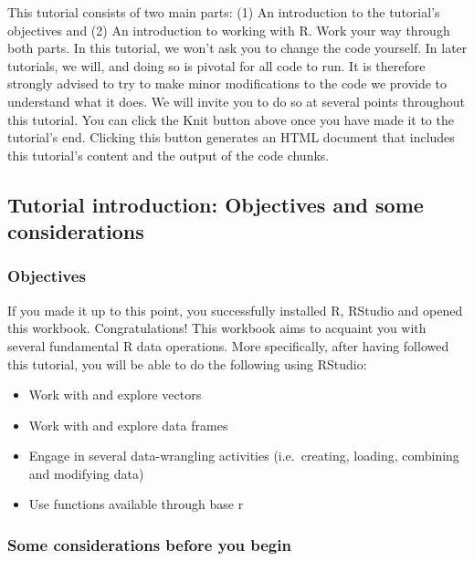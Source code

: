 \documentclass[
]{article}
\begin{document}
This tutorial consists of two main parts: (1) An introduction to the
tutorial's objectives and (2) An introduction to working with R. Work
your way through both parts. In this tutorial, we won't ask you to
change the code yourself. In later tutorials, we will, and doing so is
pivotal for all code to run. It is therefore strongly advised to try to
make minor modifications to the code we provide to understand what it
does. We will invite you to do so at several points throughout this
tutorial. You can click the Knit button above once you have made it to
the tutorial's end. Clicking this button generates an HTML document that
includes this tutorial's content and the output of the code chunks.

\hypertarget{tutorial-introduction-objectives-and-some-considerations}{%
\subsection{Tutorial introduction: Objectives and some
considerations}\label{tutorial-introduction-objectives-and-some-considerations}}

\hypertarget{objectives}{%
\subsubsection{Objectives}\label{objectives}}

If you made it up to this point, you successfully installed R, RStudio
and opened this workbook. Congratulations! This workbook aims to
acquaint you with several fundamental R data operations. More
specifically, after having followed this tutorial, you will be able to
do the following using RStudio:

\begin{itemize}
\item
  Work with and explore vectors
\item
  Work with and explore data frames
\item
  Engage in several data-wrangling activities (i.e.~creating, loading,
  combining and modifying data)
\item
  Use functions available through base r
\end{itemize}

\hypertarget{some-considerations-before-you-begin}{%
\subsubsection{Some considerations before you
begin}\label{some-considerations-before-you-begin}}
\end{document}
